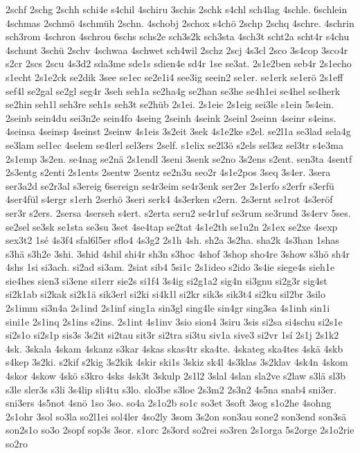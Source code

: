 {2schf
2schg
2schh
schi4e
s4chil
4schiru
3schis
2schk
s4chl
sch4lag
4schle.
6schlein
4schmas
2schmö
4schmüh
2schn.
4schobj
2schox
s4chö
2schp
2schq
4schre.
4schrin
sch3rom
4schron
4schrou
6schs
schs2e
sch3s2k
sch3sta
4sch3t
scht2a
scht4r
s4chu
4schunt
3schü
2schv
4schwaa
4schwet
sch4wil
2schz
2scj
4s3cl
2sco
3s4cop
3sco4r
s2cr
2scs
2scu
4s3d2
sda3me
sde1s
sdien4e
sd4r
1se
se3at.
2s1e2ben
seb4r
2s1echo
s1echt
2s1e2ck
se2dik
3see
se1ec
se2e1i4
see3ig
seein2
se1er.
se1erk
se1erö
2s1eff
sef4l
se2gal
se2gl
seg4r
3seh
seh1a
se2ha4g
se2han
se3he
se4h1ei
se4hel
se4herk
se2hin
seh1l
seh3re
seh1s
seh3t
se2hüb
2s1ei.
2s1eie
2s1eig
sei3le
s1ein
5s4ein.
2seinb
sein4du
sei3n2e
sein4fo
4seing
2seinh
4seink
2seinl
2seinn
4seinr
s4eins.
4seinsa
4seinsp
4seinst
2seinw
4s1eis
3s2eit
3sek
4s1e2ke
s2el.
se2l1a
se3lad
sela4g
se3lam
sel1ec
4selem
se4lerl
sel3ers
2self.
s1elix
se2l3ö
s2els
sel3sz
sel3tr
s4e3ma
2s1emp
3s2en.
se4nag
se2nä
2s1endl
3seni
3senk
se2no
3s2ens
s2ent.
sen3ta
4sentf
2s3entg
s2enti
2s1ents
2sentw
2sentz
se2n3u
seo2r
4s1e2pos
3seq
3s4er.
3sera
ser3a2d
se2r3al
s3ereig
6sereign
se4r3eim
se4r3enk
ser2er
2s1erfo
s2erfr
s3erfü
4ser4fül
s4ergr
s1erh
2serhö
3seri
serk4
4s3erken
s2ern.
2s3ernt
se1rot
4s3eröf
ser3r
s2ers.
2sersa
4serseh
s4ert.
s2erta
seru2
se4r1uf
se3rum
se3rund
3s4erv
5ses.
se2sel
se3sk
se1sta
se3su
3set
4se4tap
se2tat
4s1e2th
se1u2n
2s1ex
se2xe
4sexp
sex3t2
1sé
4s3f4
sfal6l5er
sflo4
4s3g2
2s1h
4sh.
sh2a
3s2ha.
sha2k
4s3han
1shas
s3hä
s3h2e
3shi.
3shid
4shil
shi4r
sh3n
s3hoc
4shof
3shop
sho4re
3show
s3hö
sh4r
4shs
1si
si3ach.
si2ad
si3am.
2siat
sib4
5si1c
2s1ideo
s2ido
3s4ie
siege4s
sieh1e
sie4hes
sien3
si3ene
si1err
sie2s
si1f4
3s4ig
si2g1a2
sig4n
si3gnu
si2g3r
sig4st
si2k1ab
si2kak
si2k1ä
sik3erl
si2ki
si4k1l
si2kr
sik3s
sik3t4
si2ku
sil2br
3silo
2s1imm
si3n4a
2s1ind
2s1inf
sing1a
sin3gl
sing4le
sin4gr
sing3sa
4s1inh
sin1i
sini1e
2s1inq
2s1ins
s2ins.
2s1int
4s1inv
3sio
sion4
3siru
3sis
si2sa
si4schu
si2s1e
si2s1o
si2s1p
sis3s
3s2it
si2tau
sit3r
si2tra
si3tu
siv1a
sive3
si2vr
1sí
2s1j
2s1k2
4sk.
3skala
4skam
4skanz
s3kar
4skas
skas4tr
ska4te.
4skateg
ska4tes
4skä
4skb
s4kep
3s2ki.
s2kif
s2kig
3s2kik
4skir
ski1s
3skiz
sk4l
4s3klas
3s2klav
4sk4n
4skom
4skor
4skow
4skö
s3kro
4sks
4sk3t
3skulp
2s1l2
3slal
4slan
sla2ve
s2law
s3lä
sl3b
s3le
sler3s
s3li
3s4lip
sli4tu
s3lo.
slo3be
s3loe
2s3m2
2s3n2
4s5na
snab4
sni3er.
sni3ers
4s5not
4snö
1so
3so.
so4a
2s1o2b
so1c
so3et
3soft
3sog
s1o2he
4sohng
2s1ohr
3sol
so3la
so2l1ei
sol4ler
4so2ly
3som
3s2on
son3au
sone2
son3end
son3sä
son2s1o
so3o
2sopf
sop3s
3sor.
s1orc
2s3ord
so2rei
so3ren
2s1orga
5s2orge
2s1o2rie
so2ro
}
